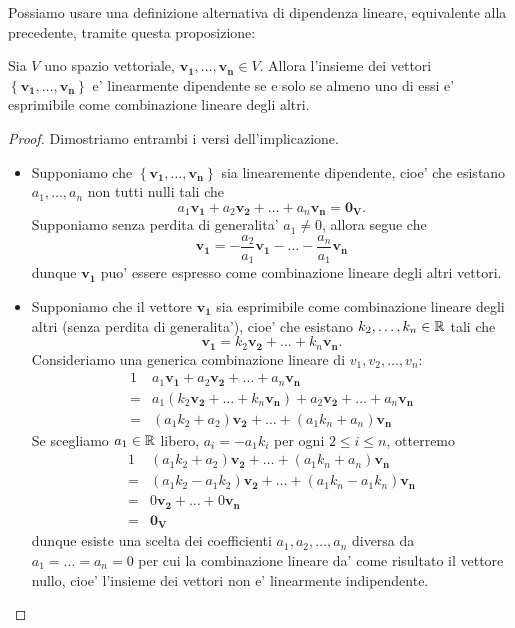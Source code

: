 Possiamo usare una definizione alternativa di dipendenza lineare, equivalente alla precedente, tramite questa proposizione:
\begin{proposition}
    Sia $V$ uno spazio vettoriale, $\bm{v_1}, \dots, \bm{v_n} \in V$. Allora l'insieme dei vettori $\left\{ \bm{v_1}, \dots, \bm{v_n} \right\}$ e' linearmente dipendente se e solo se almeno uno di essi e' esprimibile come combinazione lineare degli altri. 
\end{proposition}
\begin{proof}
    Dimostriamo entrambi i versi dell'implicazione.
    \begin{itemize}
        \item Supponiamo che $\left\{ \bm{v_1}, \dots, \bm{v_n} \right\}$ sia linearemente dipendente, cioe' che esistano $a_1, \dots, a_n$ non tutti nulli tali che \[
            a_1\bm{v_1} + a_2\bm{v_2} + \dots + a_n\bm{v_n} = \bm{0_V}   
        .\]
        Supponiamo senza perdita di generalita' $a_1 \neq 0$, allora segue che \[
            \bm{v_1} = -\frac{a_2}{a_1}\bm{v_1} - \dots - \frac{a_n}{a_1}\bm{v_n}
        \]
        dunque $\bm{v_1}$ puo' essere espresso come combinazione lineare degli altri vettori.
        \item Supponiamo che il vettore $\bm{v_1}$ sia esprimibile come combinazione lineare degli altri (senza perdita di generalita'), cioe' che esistano $k_2, \dots, k_n \in \mathbb{R}$ tali che \[
            \bm{v_1} = k_2\bm{v_2} + \dots + k_n\bm{v_n}
        .\]
        Consideriamo una generica combinazione lineare di $v_1, v_2, \dots, v_n$:
        \begin{alignat*}
            {1}
            & a_1\bm{v_1} + a_2\bm{v_2} + \dots + a_n\bm{v_n} \\
            = & a_1(k_2\bm{v_2} + \dots + k_n\bm{v_n}) + a_2\bm{v_2} + \dots + a_n\bm{v_n} \\
            = & (a_1k_2 + a_2)\bm{v_2} + \dots + (a_1k_n + a_n)\bm{v_n}
        \end{alignat*}
        Se scegliamo $a_1 \in \mathbb{R}$ libero, $a_i = -a_1k_i$ per ogni $2 \leq i \leq n$, otterremo
        \begin{alignat*}{1}
            & (a_1k_2 + a_2)\bm{v_2} + \dots + (a_1k_n + a_n)\bm{v_n} \\
            = & (a_1k_2 - a_1k_2)\bm{v_2} + \dots + (a_1k_n - a_1k_n)\bm{v_n} \\
            = & 0\bm{v_2} + \dots + 0\bm{v_n} \\
            = & \bm{0_V}
        \end{alignat*}
        dunque esiste una scelta dei coefficienti $a_1, a_2, \dots, a_n$ diversa da $a_1 = \dots = a_n = 0$ per cui la combinazione lineare da' come risultato il vettore nullo, cioe' l'insieme dei vettori non e' linearmente indipendente.
    \end{itemize}
    
\end{proof}

